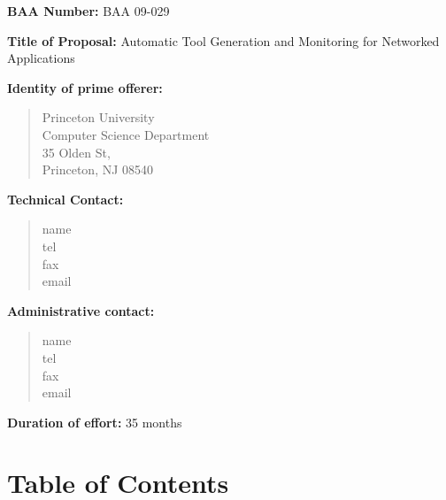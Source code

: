 \documentclass[12pt]{article}
\begin{document}
{\bf BAA Number:} BAA 09-029

\vspace{.5in}

{\bf Title of Proposal:}  
Automatic Tool Generation and Monitoring for Networked Applications

\vspace{.5in}

{\bf Identity of prime offerer:}
\begin{quote}
Princeton University \\
Computer Science Department \\
35 Olden St, \\
Princeton, NJ 08540
\end{quote}

\vspace{.5in}

{\bf Technical Contact:}  
\begin{quote}
name \\
tel \\
fax \\
email \\
\end{quote}

\vspace{.5in}

{\bf Administrative contact:}
\begin{quote}
name \\
tel \\
fax \\
email \\
\end{quote}

\vspace{.5in}

{\bf Duration of effort:} 35 months

\newpage

\setcounter{page}{1}
\appendix

\section{Table of Contents}
\tableofcontents\
\newpage
\pagenumbering{arabic}
\setcounter{page}{1}
\end{document}
